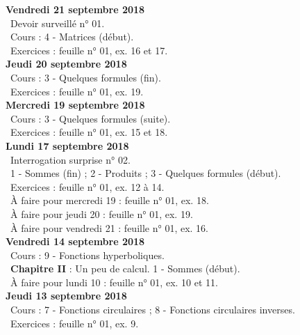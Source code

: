 \documentclass[12pt,a4paper]{article}
\begin{document}
\noindent\textbf{Vendredi 21 septembre 2018}\\
\bu\ Devoir surveillé n° 01.\\
\bu\ Cours : 4 - Matrices (début).\\
\bu\ Exercices : feuille n° 01, ex. 16 et 17.\vspace{.4cm}\\
 
\noindent\textbf{Jeudi 20 septembre 2018}\\
\bu\ Cours : 3 - Quelques formules (fin).\\
\bu\ Exercices : feuille n° 01, ex. 19.\vspace{.4cm}\\

\noindent\textbf{\bf Mercredi 19 septembre 2018}\\
\bu\ Cours : 3 - Quelques formules (suite).\\
\bu\ Exercices : feuille n° 01, ex. 15 et 18.\vspace{.4cm}\\

\noindent\textbf{\bf Lundi 17 septembre 2018}\\ 
\bu\ Interrogation surprise n° 02.\\
\bu\ 1 - Sommes (fin) ; 2 - Produits ; 3 - Quelques formules (début).\\
\bu\ Exercices : feuille n° 01, ex. 12 à 14.\\
\bu\ À faire pour mercredi 19 : feuille n° 01, ex. 18.\\
\bu\ À faire pour jeudi 20 : feuille n° 01, ex. 19.\\
\bu\ À faire pour vendredi 21 : feuille n° 01, ex. 16.\vspace{.4cm}\\

\noindent\textbf{Vendredi 14 septembre 2018}\\
\bu\ Cours : 9 - Fonctions hyperboliques.\\
\bu\ \textbf{Chapitre II} \rm : Un peu de calcul. 1 - Sommes (début).\\
\bu\ À faire pour lundi 10 : feuille n° 01, ex. 10 et 11.\vspace{.4cm}\\

\noindent\textbf{\bf Jeudi 13 septembre 2018}\\
\bu\ Cours : 7 - Fonctions circulaires ; 8 - Fonctions circulaires inverses.\\
\bu\ Exercices : feuille n° 01, ex. 9.\vspace{.4cm}\\
    
\end{document}
